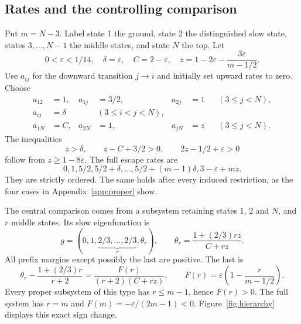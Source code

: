 \documentclass[11pt,a4paper]{article}
\theoremstyle{remark}\newtheorem{remark}[theorem]{Remark}
\begin{document}
\subsection{Rates and the controlling comparison}
Put $m=N-3$. Label state 1 the ground, state 2 the distinguished slow state, states $3,\ldots,N-1$ the middle states, and state $N$ the top. Let
\begin{equation}
 0<\varepsilon<1/14,\quad \delta=\varepsilon,\quad
 C=2-\varepsilon,\quad
 z=1-2\varepsilon-\frac{3\varepsilon}{m-1/2}.
 \label{eq:parameters}
\end{equation}
Use $a_{ij}$ for the downward transition $j\to i$ and initially set upward rates to zero. Choose
\begin{align}
 a_{12}&=1,& a_{1j}&=3/2,& a_{2j}&=1 &&(3\le j<N),\nonumber\\
 a_{ij}&=\delta &&(3\le i<j<N),\nonumber\\
 a_{1N}&=C,&a_{2N}&=1,&a_{jN}&=z &&(3\le j<N).
 \label{eq:hierarchyrates}
\end{align}
The inequalities
\begin{equation}
 z>\delta,\qquad z-C+3/2>0,\qquad 2z-1/2+\varepsilon>0
 \label{eq:paramineq}
\end{equation}
follow from $z\ge1-8\varepsilon$. The full escape rates are
\begin{equation}
 0, 1, 5/2, 5/2+\delta,\ldots,5/2+(m-1)\delta, 3-\varepsilon+mz.
\end{equation}
They are strictly ordered. The same holds after every induced restriction, as the four cases in Appendix~\ref{app:proper} show.

The central comparison comes from a subsystem retaining states 1, 2 and $N$, and $r$ middle states. Its slow eigenfunction is
\begin{equation}
 g=(0,1,\underbrace{2/3,\ldots,2/3}_{r},\theta_r),\qquad
 \theta_r=\frac{1+(2/3)rz}{C+rz}.
 \label{eq:hierg}
\end{equation}
All prefix margins except possibly the last are positive. The last is
\begin{equation}
 \theta_r-\frac{1+(2/3)r}{r+2}
 =\frac{F(r)}{(r+2)(C+rz)},\qquad
 F(r)=\varepsilon\left(1-\frac{r}{m-1/2}\right).
 \label{eq:forcing}
\end{equation}
Every proper subsystem of this type has $r\le m-1$, hence $F(r)>0$. The full system has $r=m$ and $F(m)=-\varepsilon/(2m-1)<0$. Figure~\ref{fig:hierarchy} displays this exact sign change.
\end{document}
